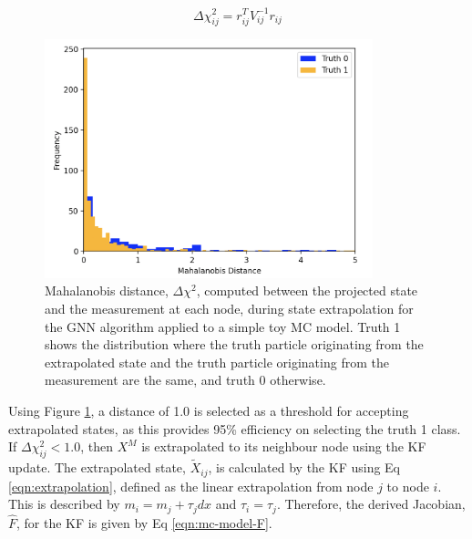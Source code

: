 \begin{equation}
\Delta \chi_{ij}^{2} = r_{ij}^{T} {V}_{ij}^{-1} r_{ij}
\label{eqn:mahalanobis-distance}
\end{equation}


\begin{figure}[htbp]
    \centering
    \includegraphics[width=0.85\textwidth]{images/5-gnn-algorithm/mahalanobis-threshold-toy-model.png}
    \caption{Mahalanobis distance, $\Delta \chi^{2}$, computed between the projected state and the measurement at each node, during state extrapolation for the GNN algorithm applied to a simple toy MC model. Truth 1 shows the distribution where the truth particle originating from the extrapolated state and the truth particle originating from the measurement are the same, and truth 0 otherwise.}
    \label{fig:mahalanobis-threshold-toy-model}%
\end{figure}



Using Figure \ref{fig:mahalanobis-threshold-toy-model}, a distance of 1.0 is selected as a threshold for accepting extrapolated states, as this provides 95\% efficiency on selecting the truth 1 class. If $\Delta \chi_{ij}^{2} < 1.0$, then $X^M$ is extrapolated to its neighbour node using the KF update. The extrapolated state, $\widetilde{X}_{ij}$, is calculated by the KF using Eq \eqref{eqn:extrapolation}, defined as the linear extrapolation from node $j$ to node $i$. This is described by $m_i = m_j + \tau_j dx$ and $\tau_i = \tau_j$. Therefore, the derived Jacobian, $\hat{F}$, for the KF is given by Eq \eqref{eqn:mc-model-F}.


